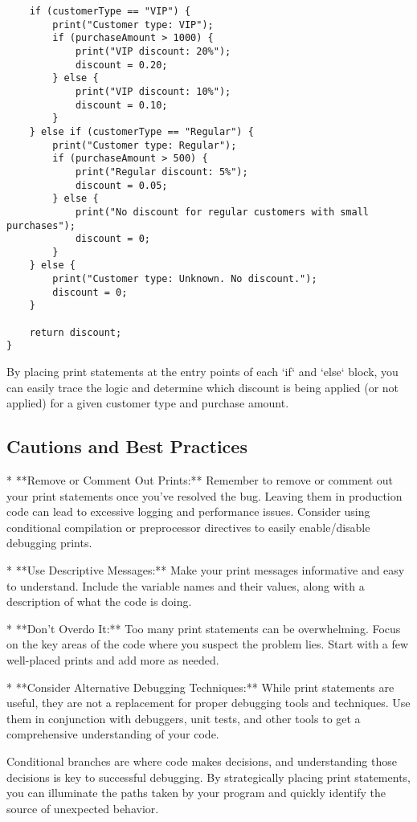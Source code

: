 \documentclass{article}
\begin{document}
{{{\begin{verbatim}
    if (customerType == "VIP") {
        print("Customer type: VIP");
        if (purchaseAmount > 1000) {
            print("VIP discount: 20%");
            discount = 0.20;
        } else {
            print("VIP discount: 10%");
            discount = 0.10;
        }
    } else if (customerType == "Regular") {
        print("Customer type: Regular");
        if (purchaseAmount > 500) {
            print("Regular discount: 5%");
            discount = 0.05;
        } else {
            print("No discount for regular customers with small purchases");
            discount = 0;
        }
    } else {
        print("Customer type: Unknown. No discount.");
        discount = 0;
    }

    return discount;
}

\end{verbatim}

By placing print statements at the entry points of each `if` and `else` block, you can easily trace the logic and determine which discount is being applied (or not applied) for a given customer type and purchase amount.

\subsection*{Cautions and Best Practices}

*   **Remove or Comment Out Prints:**  Remember to remove or comment out your print statements once you've resolved the bug.  Leaving them in production code can lead to excessive logging and performance issues.  Consider using conditional compilation or preprocessor directives to easily enable/disable debugging prints.

*   **Use Descriptive Messages:**  Make your print messages informative and easy to understand. Include the variable names and their values, along with a description of what the code is doing.

*   **Don't Overdo It:** Too many print statements can be overwhelming.  Focus on the key areas of the code where you suspect the problem lies.  Start with a few well-placed prints and add more as needed.

*   **Consider Alternative Debugging Techniques:** While print statements are useful, they are not a replacement for proper debugging tools and techniques.  Use them in conjunction with debuggers, unit tests, and other tools to get a comprehensive understanding of your code.

Conditional branches are where code makes decisions, and understanding those decisions is key to successful debugging. By strategically placing print statements, you can illuminate the paths taken by your program and quickly identify the source of unexpected behavior.

}}}
\end{document}
